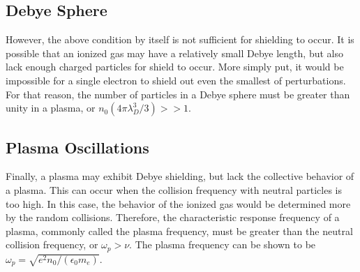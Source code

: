 \subsection{Debye Sphere}
However, the above condition by itself is not sufficient for shielding to occur.
It is possible that an ionized gas may have a relatively small Debye length, but
also lack enough charged particles for shield to occur. More simply put, it
would be impossible for a single electron to shield out even the smallest of
perturbations. For that reason, the number of particles in a Debye sphere must
be greater than unity in a plasma, or $n_0(4\pi \lambda_D^3/3) >> 1$.

\subsection{Plasma Oscillations}
Finally, a plasma may exhibit Debye shielding, but lack the collective behavior
of a plasma. This can occur when the collision frequency with neutral particles
is too high. In this case, the behavior of the ionized gas would be determined
more by the random collisions. Therefore, the characteristic response frequency
of a plasma, commonly called the plasma frequency, must be greater than the
neutral collision frequency, or {$\omega_p > \nu$}. The plasma frequency can be
shown to be $\omega_p = \sqrt{e^2n_0/(\epsilon_0 m_e)}$.

